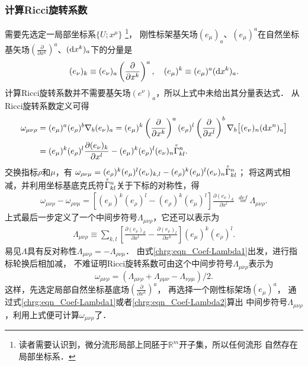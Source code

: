 \subsubsection{计算Ricci旋转系数}
     需要先选定一局部坐标系$\{U;x^\mu\}$
    {\footnote{读者需要认识到，微分流形局部上同胚于$\mathbb{R}^m$开子集，所以任何流形
            自然存在局部坐标系．}}，
刚性标架基矢场$(e_\mu)_{a}$、$(e_\mu)^{a}$在自然坐标
基矢场$(\frac{\partial}{\partial x^k})^{a}$、$({\rm d}x^k)_{a}$下的分量是
\begin{equation}\label{chrg:eqn_component-base}
(e_\nu)_{k} \equiv (e_\nu)_{a} \left(\frac{\partial}{\partial x^k}\right)^{a} , \quad
(e_\mu)^{k} \equiv (e_\mu)^{a} ({\rm d}x^k)_{a}.
\end{equation}
计算Ricci旋转系数并不需要基矢场$(e^\nu)_{a}$，所以上式中未给出其分量表达式．
从Ricci旋转系数定义可得
\begin{align*}
  \omega_{\mu\nu\rho} &= (e_\mu)^a  (e_\rho)^b \nabla _b (e_\nu)_a
  = (e_\mu)^{k} \left(\frac{\partial}{\partial x^k}\right)^{a}
   (e_\rho)^{l} \left(\frac{\partial}{\partial x^l}\right)^{b}
    \nabla _b \bigl[ (e_\nu)_{n}({\rm d}x^n)_{a} \bigr]  \\
  &=(e_\mu)^{k}(e_\rho)^{l} \frac{\partial (e_\nu)_{k}}{\partial x^l}
   -(e_\mu)^{k}(e_\rho)^{l} (e_\nu)_{n} \oversetmy{x}{\Gamma}^n _{kl} .
\end{align*}
交换指标$\rho$和$\mu$，有
$ \omega_{\rho\nu\mu} =(e_\rho)^{k}(e_\mu)^{l} (e_\nu)_{k,l}
-(e_\rho)^{k}(e_\mu)^{l} (e_\nu)_{n} \oversetmy{x}{\Gamma}^n _{kl}$；
将这两式相减，并利用坐标基底克氏符$\oversetmy{x}{\Gamma}^n _{kl}$关于下标的对称性，得
\begin{align}
  \omega_{\mu\nu\rho}  -  \omega_{\rho\nu\mu}=
  \left[ (e_\mu)^{k}(e_\rho)^{l}
     - (e_\rho)^{k}(e_\mu)^{l}  \right]
     \frac{\partial (e_\nu)_{k}}{\partial x^l}
  \ \overset{def}{=} \Lambda_{\mu\nu\rho}. \label{chrg:eqn_Coef-Lambda1}
\end{align}
上式最后一步定义了一个中间步符号$\Lambda_{\mu\nu\rho}$，它还可以表示为
\begin{align}
    \Lambda_{\mu\nu\rho} \equiv \sum_{k,l }
    \left[ \frac{\partial (e_\nu)_{k}}{\partial x^l} -\frac{\partial (e_\nu)_{l}}{\partial x^k} \right]
    (e_\mu)^{k} (e_\rho)^{l} .  \label{chrg:eqn_Coef-Lambda2}
\end{align}
易见$\Lambda$具有反对称性$\Lambda_{\mu\nu\rho}=-\Lambda_{\rho\nu\mu}$．
由式\eqref{chrg:eqn_Coef-Lambda1}出发，进行指标轮换后相加减，
不难证明Ricci旋转系数可由这个中间步符号$\Lambda_{\mu\nu\rho}$表示为
\begin{equation}\label{chrg:eqn_Ricci-Coef}
\omega_{\mu\nu\rho} = \left(\Lambda_{\mu\nu\rho}
+ \Lambda_{\rho\mu\nu} - \Lambda_{\nu\rho\mu} \right) /2.
\end{equation}
这样，先选定局部自然坐标基底场$(\frac{\partial}{\partial x^k})^{a}$，
再选择一个刚性标架场$(e_\mu)^a$，
通过式\eqref{chrg:eqn_Coef-Lambda1}或者\eqref{chrg:eqn_Coef-Lambda2}算出
中间步符号$\Lambda_{\mu\nu\rho}$，利用上式便可计算$\omega_{\mu\nu\rho}$了．

